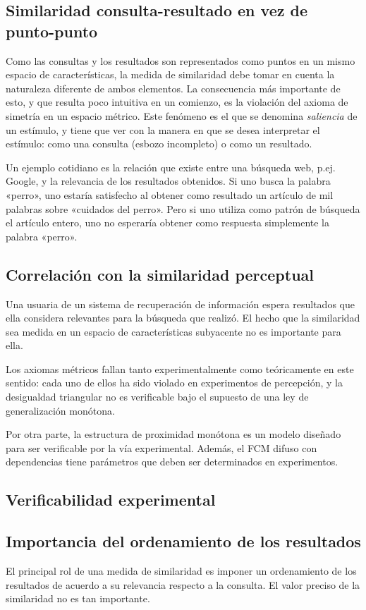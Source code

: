 \documentclass[spanish]{article}
\begin{document}
\subsection{Similaridad consulta-resultado en vez de punto-punto}
Como las consultas y los resultados son representados como puntos en un
mismo espacio de características, la medida de similaridad debe tomar en cuenta
la naturaleza diferente de ambos elementos.  La consecuencia más importante de
esto, y que resulta poco intuitiva en un comienzo, es la violación del axioma de
simetría en un espacio métrico.  Este fenómeno es el que se denomina
\emph{saliencia} de un estímulo, y tiene que ver con la manera en que se desea
interpretar el estímulo: como una consulta (esbozo incompleto) o como un resultado.

Un ejemplo cotidiano es la relación que existe entre una búsqueda web, p.ej.
Google, y la relevancia de los resultados obtenidos.  Si uno busca la palabra
«perro», uno estaría satisfecho al obtener como resultado un artículo de mil
palabras sobre «cuidados del perro».  Pero si uno utiliza como patrón de
búsqueda el artículo entero, uno no esperaría obtener como respuesta simplemente
la palabra «perro».

\subsection{Correlación con la similaridad perceptual}
Una usuaria de un sistema de recuperación de información espera resultados
que ella considera relevantes para la búsqueda que realizó.  El hecho que la
similaridad sea medida en un espacio de características subyacente no es
importante para ella.

Los axiomas métricos fallan tanto experimentalmente como teóricamente en este
sentido:  cada uno de ellos ha sido violado en experimentos de percepción, y la
desigualdad triangular no es verificable bajo el supuesto de una ley de
generalización monótona.

Por otra parte, la estructura de proximidad monótona es un modelo diseñado para
ser verificable por la vía experimental.  Además, el FCM difuso con dependencias
tiene parámetros que deben ser determinados en experimentos.

\subsection{Verificabilidad experimental}


\subsection{Importancia del ordenamiento de los resultados}
El principal rol de una medida de similaridad es imponer un ordenamiento de los
resultados de acuerdo a su relevancia respecto a la consulta.  El valor preciso
de la similaridad no es tan importante.
\end{document}
